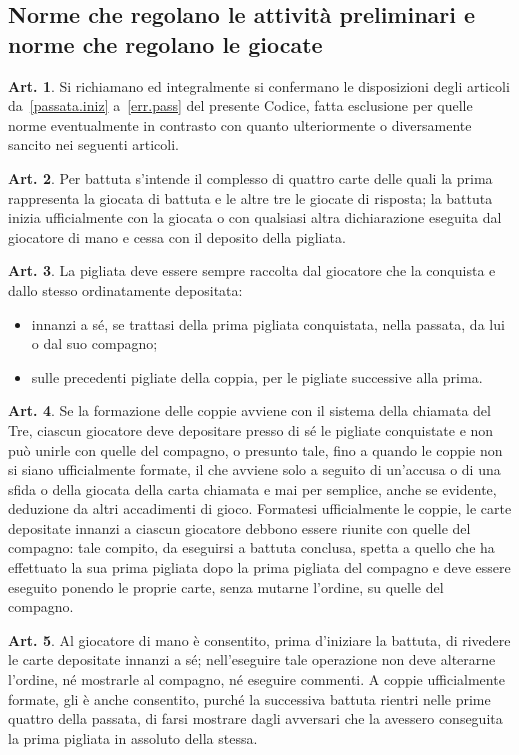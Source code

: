 \documentclass[italian,a4paper]{book}
\theoremstyle{definition}
\newtheorem{art}{Art.}
\newenvironment{packeditem}{
\begin{itemize}
  \setlength{\itemsep}{1pt}
  \setlength{\parskip}{0pt}
  \setlength{\parsep}{0pt}
}{\end{itemize}}
\begin{document}
\subsection{Norme che regolano le attività preliminari e norme che regolano le giocate}
\begin{art}
Si richiamano ed integralmente si confermano le disposizioni degli articoli
da~\ref{passata.iniz} a~\ref{err.pass} del presente Codice, fatta esclusione per quelle norme eventualmente in contrasto con quanto ulteriormente o diversamente sancito nei seguenti articoli.
\end{art}
\begin{art}
Per battuta s'intende il complesso di quattro carte delle quali la prima rappresenta la giocata di battuta e le altre tre le giocate di risposta; la battuta inizia ufficialmente con la giocata o con qualsiasi altra dichiarazione eseguita dal giocatore di mano e cessa con il deposito della pigliata.
\end{art}
\begin{art}
La pigliata deve essere sempre raccolta dal giocatore che la conquista e dallo stesso ordinatamente depositata:
\begin{packeditem}
\item innanzi a sé, se trattasi della prima pigliata conquistata, nella passata, da lui o dal suo compagno;
\item sulle precedenti pigliate della coppia, per le pigliate successive alla prima.
    \end{packeditem}
\end{art}
\begin{art}
Se la formazione delle coppie avviene con il sistema della chiamata del Tre, ciascun giocatore deve depositare presso di sé le pigliate conquistate e non può unirle con quelle del compagno, o presunto tale, fino a quando le coppie non si siano ufficialmente formate, il che avviene solo a seguito di un'accusa o di una sfida o della giocata della carta chiamata e mai per semplice, anche se evidente, deduzione da altri accadimenti di gioco. Formatesi ufficialmente le coppie, le carte depositate innanzi a ciascun giocatore debbono essere riunite con quelle del compagno: tale compito, da eseguirsi a battuta conclusa,   spetta a quello che ha effettuato la sua prima pigliata dopo la prima pigliata del compagno e deve essere eseguito ponendo le proprie carte, senza mutarne l'ordine, su quelle del compagno.
\end{art}
\begin{art}\label{rivedere}
Al giocatore di mano è consentito, prima d'iniziare la battuta, di rivedere le carte depositate innanzi a sé; nell'eseguire tale operazione non deve alterarne l'ordine, né mostrarle al compagno, né eseguire commenti. A coppie ufficialmente formate, gli è anche consentito, purché la successiva battuta rientri nelle prime quattro della passata, di farsi mostrare dagli avversari che la avessero conseguita la prima pigliata in assoluto della stessa.
\end{art}
\end{document}
